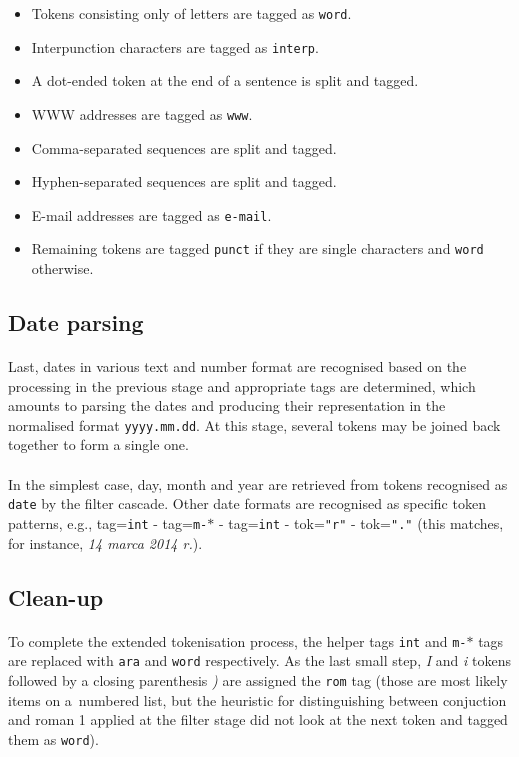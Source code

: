 \documentclass[oneside,12pt]{article}
\begin{document}
\begin{itemize}
        \item Tokens consisting only of letters are tagged as \texttt{word}.
        \item Interpunction characters are tagged as \texttt{interp}.
        \item A dot-ended token at the end of a sentence is split and tagged.
        \item WWW addresses are tagged as \texttt{www}.
        \item Comma-separated sequences are split and tagged.
        \item Hyphen-separated sequences are split and tagged.
        \item E-mail addresses are tagged as \texttt{e-mail}.
        \item Remaining tokens are tagged \texttt{punct} if they are single characters and \texttt{word} otherwise.
    \end{itemize}

\subsection{Date parsing}

\paragraph{}
Last, dates in various text and number format are recognised based on the processing in the previous stage and appropriate tags are determined, which amounts to parsing the dates and producing their representation in the normalised format \texttt{yyyy.mm.dd}. At this stage, several tokens may be joined back together to form a single one.

\paragraph{}
In the simplest case, day, month and year are retrieved from tokens recognised as \texttt{date} by the filter cascade. Other date formats are recognised as specific token patterns, e.g., tag=\texttt{int} - tag=\texttt{m-$\ast$} - tag=\texttt{int} - tok=\texttt{"r"} - tok=\texttt{"."} (this matches, for instance, \textit{14 marca 2014 r.}).

\subsection{Clean-up}

\paragraph{}
To complete the extended tokenisation process, the helper tags \texttt{int} and \texttt{m-$\ast$} tags are replaced with \texttt{ara} and \texttt{word} respectively. As the last small step, \textit{I} and \textit{i} tokens followed by a closing parenthesis \textit{)} are assigned the \texttt{rom} tag (those are most likely items on a~numbered list, but the heuristic for distinguishing between conjuction and roman 1 applied at the filter stage did not look at the next token and tagged them as \texttt{word}).
\end{document}
